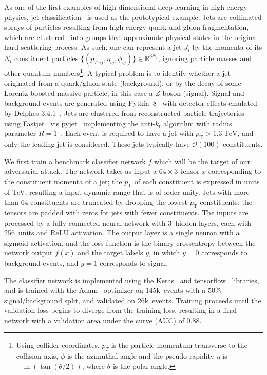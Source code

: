 \documentclass[reprint,nofootinbib,...]{revtex4-1}
\newcommand{\nconst}{64}       %
\newcommand{\nlayerCLS}{3}     %
\newcommand{\nunitsCLS}{256} %
\newcommand{\ntrain}{145k}       %
\newcommand{\nval}{26k}            %
\newcommand{\aucCLS}{0.88}    %
\newcommand{\pt}{p_\mathrm{T}} %
\begin{document}
As one of the first examples of high-dimensional deep learning in high-energy physics, jet classification~\cite{Larkoski:2017jix} is used as the prototypical example.
Jets are collimated sprays of particles resulting from high energy quark and gluon fragmentation, which are clustered~\cite{Cacciari:2008gp} into groups that approximate physical states in the original hard scattering process.
As such, one can represent a jet $J_i$ by the momenta of its $N_i$ constituent particles $\{(p_{T,ij},\eta_{ij},\phi_{ij})\}\in\mathbb{R}^{3N_i}$, ignoring particle masses and other quantum numbers\footnote{Using collider coordinates, $p_T$ is the particle momentum transverse to the collision axis, $\phi$ is the azimuthal angle and the pseudo-rapidity $\eta$ is $-\ln(\tan(\theta/2))$, where $\theta$ is the polar angle.}.
A typical problem is to identify whether a jet originated from a quark/gluon state (background), or by the decay of some Lorentz boosted massive particle, in this case a $Z$ boson (signal).  Signal and background events are generated using Pythia~8~\cite{Sjostrand:2006za,Sjostrand:2007gs} with detector effects emulated by Delphes 3.4.1~\cite{deFavereau:2013fsa}.  Jets are clustered from reconstructed particle trajectories using Fastjet~\cite{Cacciari:2011ma,Cacciari:2005hq} vis pyjet~\cite{noel_dawe_2019_2672944} implementing the anti-$k_t$ algorithm with radius parameter $R=1$~\cite{Cacciari:2008gp}.
Each event is required to have a jet with $p_\mathrm{T} > 1.3\ \mathrm{TeV}$, and only the leading jet is considered.  These jets typically have $\mathcal{O}(100)$ constituents. 

We first train a benchmark classifier network $f$ which will be the target of our adversarial attack.
The network takes as input a $\nconst\times3$ tensor $x$ corresponding to the constituent momenta of a jet; the $\pt$ of each constituent is expressed in units of TeV, resulting a input dynamic range that is of order unity.
Jets with more than $\nconst$ constituents are truncated by dropping the lowest-$\pt$ constituents; the tensors are padded with zeros for jets with fewer constituents.
The inputs are processed by a fully-connected neural network with \nlayerCLS\ hidden layers, each with \nunitsCLS\ units and ReLU activation.
The output layer is a single neuron with a sigmoid activation, and the loss function is the binary crossentropy between the network output $f(x)$ and the target labels $y$, in which $y=0$ corresponds to background events, and $y=1$ corresponds to signal.

The classifier network is implemented using the Keras~\cite{keras} and tensorflow~\cite{tensorflow} libraries, and is trained with the Adam~\cite{adam} optimizer on \ntrain\ events with a 50\% signal/background split, and validated on \nval\ events.
Training proceeds until the validation loss begins to diverge from the training loss, resulting in a final network with a validation area under the curve (AUC) of \aucCLS.
\end{document}
